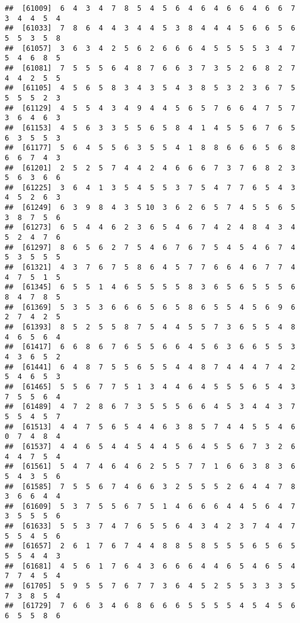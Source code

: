 \documentclass[
]{book}
\begin{document}
\begin{verbatim}
##  [61009]  6  4  3  4  7  8  5  4  5  6  4  6  4  6  6  4  6  6  7  3  4  4  5  4
##  [61033]  7  8  6  4  4  3  4  4  5  3  8  4  4  4  5  6  6  5  6  5  5  3  5  8
##  [61057]  3  6  3  4  2  5  6  2  6  6  6  4  5  5  5  5  3  4  7  5  4  6  8  5
##  [61081]  7  5  5  5  6  4  8  7  6  6  3  7  3  5  2  6  8  2  7  4  4  2  5  5
##  [61105]  4  5  6  5  8  3  4  3  5  4  3  8  5  3  2  3  6  7  5  5  5  5  2  3
##  [61129]  4  5  5  4  3  4  9  4  4  5  6  5  7  6  6  4  7  5  7  3  6  4  6  3
##  [61153]  4  5  6  3  3  5  5  6  5  8  4  1  4  5  5  6  7  6  5  6  3  5  5  3
##  [61177]  5  6  4  5  5  6  3  5  5  4  1  8  8  6  6  6  5  6  8  6  6  7  4  3
##  [61201]  2  5  2  5  7  4  4  2  4  6  6  6  7  3  7  6  8  2  3  5  6  3  6  6
##  [61225]  3  6  4  1  3  5  4  5  5  3  7  5  4  7  7  6  5  4  3  4  5  2  6  3
##  [61249]  6  3  9  8  4  3  5 10  3  6  2  6  5  7  4  5  5  6  5  3  8  7  5  6
##  [61273]  6  5  4  4  6  2  3  6  5  4  6  7  4  2  4  8  4  3  4  5  2  4  7  6
##  [61297]  8  6  5  6  2  7  5  4  6  7  6  7  5  4  5  4  6  7  4  5  3  5  5  5
##  [61321]  4  3  7  6  7  5  8  6  4  5  7  7  6  6  4  6  7  7  4  4  7  5  1  5
##  [61345]  6  5  5  1  4  6  5  5  5  5  8  3  6  5  6  5  5  5  6  8  4  7  8  5
##  [61369]  5  3  5  3  6  6  6  5  6  5  8  6  5  5  4  5  6  9  6  2  7  4  2  5
##  [61393]  8  5  2  5  5  8  7  5  4  4  5  5  7  3  6  5  5  4  8  4  6  5  6  4
##  [61417]  6  6  8  6  7  6  5  5  6  6  4  5  6  3  6  6  5  5  3  4  3  6  5  2
##  [61441]  6  4  8  7  5  5  6  5  5  4  4  8  7  4  4  4  7  4  2  5  4  6  5  3
##  [61465]  5  5  6  7  7  5  1  3  4  4  6  4  5  5  5  6  5  4  3  7  5  5  6  4
##  [61489]  4  7  2  8  6  7  3  5  5  5  6  6  4  5  3  4  4  3  7  5  5  4  5  7
##  [61513]  4  4  7  5  6  5  4  4  6  3  8  5  7  4  4  5  5  4  6  0  7  4  8  4
##  [61537]  4  4  6  5  4  4  5  4  4  5  6  4  5  5  6  7  3  2  6  4  4  7  5  4
##  [61561]  5  4  7  4  6  4  6  2  5  5  7  7  1  6  6  3  8  3  6  5  4  3  5  6
##  [61585]  7  5  5  6  7  4  6  6  3  2  5  5  5  2  6  4  4  7  8  3  6  6  4  4
##  [61609]  5  3  7  5  5  6  7  5  1  4  6  6  6  4  4  5  6  4  7  3  5  5  5  6
##  [61633]  5  5  3  7  4  7  6  5  5  6  4  3  4  2  3  7  4  4  7  5  5  4  5  6
##  [61657]  2  6  1  7  6  7  4  4  8  8  5  8  5  5  5  6  5  6  5  5  5  4  4  3
##  [61681]  4  5  6  1  7  6  4  3  6  6  6  4  4  6  5  4  6  5  4  7  7  4  5  4
##  [61705]  5  9  5  5  7  6  7  7  3  6  4  5  2  5  5  3  3  3  5  7  3  8  5  4
##  [61729]  7  6  6  3  4  6  8  6  6  6  5  5  5  5  4  5  4  5  6  6  5  5  8  6

\end{verbatim}
\end{document}
